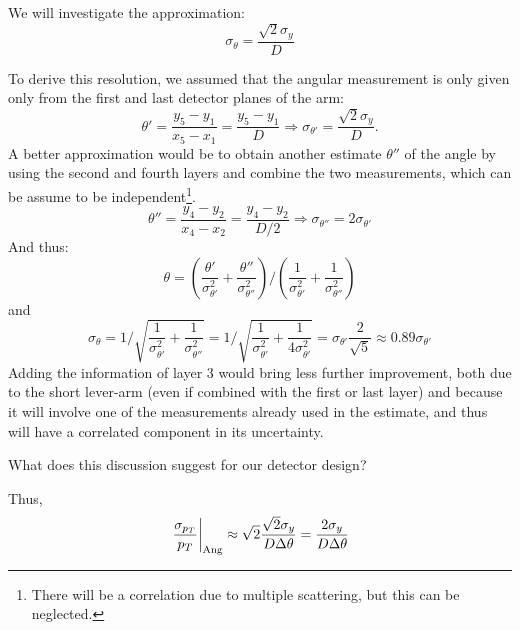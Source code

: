 \documentclass[a4paper,11pt,twoside]{article}
\begin{document}
\begin{tcolorbox}[colback=black!5!white,colframe=black!75!white,title=Angular Resolution]
  We will investigate the approximation:
  \begin{equation}
    \sigma_\theta=\frac{\sqrt{2}\sigma_y}{D}
  \end{equation}

  To derive this resolution, we assumed that the angular measurement is only given only from the first and last detector planes of the arm:
  \begin{equation}
    \theta'=\frac{y_5-y_1}{x_5-x_1}=\frac{y_5-y_1}{D}\Rightarrow \sigma_{\theta'}=\frac{\sqrt{2}\sigma_y}{D}.
  \end{equation}
  A better approximation would be to obtain another estimate $\theta''$ of the angle by using the second and fourth layers and combine the two measurements, which can be assume to be independent\footnote{There will be a correlation due to multiple scattering, but this can be neglected.}.
  \begin{equation}
    \theta''=\frac{y_4-y_2}{x_4-x_2}=\frac{y_4-y_2}{D/2}\Rightarrow \sigma_{\theta''}=2\sigma_{\theta'}
  \end{equation}
  And thus:
  \begin{equation}
    \theta = \left(\frac{\theta'}{\sigma^2_{\theta'}}+\frac{\theta''}{\sigma^2_{\theta''}}\right)/\left(\frac{1}{\sigma^2_{\theta'}}+\frac{1}{\sigma^2_{\theta''}}\right)
    \end{equation}
  and
  \begin{equation}
    \sigma_{\theta} = 1/\sqrt{\frac{1}{\sigma^2_{\theta'}}+\frac{1}{\sigma^2_{\theta''}}} =
    1/\sqrt{\frac{1}{\sigma^2_{\theta'}}+\frac{1}{4\sigma^2_{\theta'}}} = \sigma_{\theta'} \frac{2}{\sqrt{5}} \approx 0.89\sigma_{\theta'} 
  \end{equation}
  Adding the information of layer 3 would bring less further improvement, both due to the short lever-arm (even if combined with the first or last layer) and because it will involve one of the measurements already used in the estimate, and thus will have a correlated component in its uncertainty.

  What does this discussion suggest for our detector design?
\end{tcolorbox}

Thus,
\begin{equation}
  \left.\frac{\sigma_{p_T}}{p_T}\right|_{\rm Ang}\approx \sqrt{2}\frac{\sqrt{2}\sigma_y}{D\Delta\theta}
  = \frac{2\sigma_y}{D\Delta\theta}
\end{equation}
\end{document}

